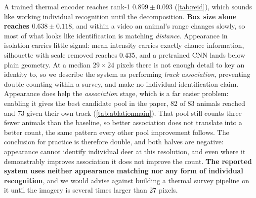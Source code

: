 A trained thermal encoder reaches rank-1 $0.899 \pm 0.093$ (\cref{tab:reid}), which sounds like working individual recognition until the decomposition. \textbf{Box size alone reaches
$0.638 \pm 0.118$}, and within
a video an animal's range changes slowly, so most of what looks like identification is
matching \emph{distance}. Appearance in isolation carries little signal: mean intensity carries exactly
chance information, silhouette with scale removed reaches 0.435, and a pretrained CNN lands
below plain geometry. At a median $29\times24$ pixels there is not enough detail to key an
identity to, so we describe the system as performing \emph{track association}, preventing
double counting within a survey, and make no individual-identification claim. Appearance
does help the \emph{association} stage, which is a far easier problem: enabling it gives the
best candidate pool in the paper, 82 of 83 animals reached and 73 given their own track
(\cref{tab:ablationmain}). That pool still counts three fewer animals than the baseline,
so better association does not translate into a better count, the same pattern every other
pool improvement follows. The conclusion for practice is therefore double, and both halves
are negative: appearance cannot identify individual deer at this resolution, and even where
it demonstrably improves association it does not improve the count. \textbf{The reported system uses neither appearance matching nor any form of individual recognition}, and we would advise against building a
thermal survey pipeline on it until the imagery is several times larger than 27 pixels.
